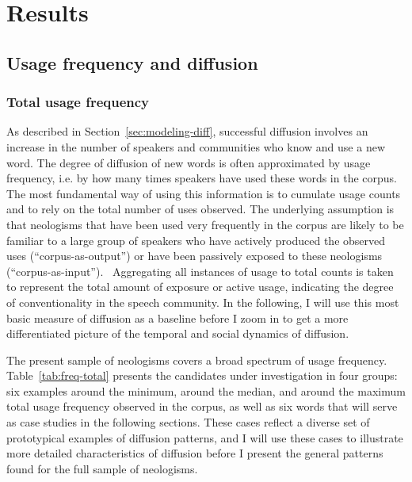 \documentclass[
  a4paper,
  abstract=on,
  captions=tableabove
  ]{scrartcl}
\begin{document}
\section{Results}
  \label{sec:results}

  \subsection{Usage frequency and diffusion}
    \label{subsec:freq}

    \subsubsection{Total usage frequency}
      \label{subsec:total-freq}

      As described in Section~\ref{sec:modeling-diff}, successful diffusion involves an increase in the number of speakers and communities who know and use a new word. The degree of diffusion of new words is often approximated by usage frequency, i.e. by how many times speakers have used these words in the corpus. The most fundamental way of using this information is to cumulate usage counts and to rely on the total number of uses observed. The underlying assumption is that neologisms that have been used very frequently in the corpus are likely to be familiar to a large group of speakers who have actively produced the observed uses (\enquote{corpus-as-output}) or have been passively exposed to these neologisms (\enquote{corpus-as-input}).~\parencite{Stefanowitsch2017CorpusbasedPerspective} Aggregating all instances of usage to total counts is taken to represent the total amount of exposure or active usage, indicating the degree of conventionality in the speech community. In the following, I will use this most basic measure of diffusion as a baseline before I zoom in to get a more differentiated picture of the temporal and social dynamics of diffusion.

      The present sample of neologisms covers a broad spectrum of usage frequency. Table~\ref{tab:freq-total} presents the candidates under investigation in four groups: six examples around the minimum, around the median, and around the maximum total usage frequency observed in the corpus, as well as six words that will serve as case studies in the following sections. These cases reflect a diverse set of prototypical examples of diffusion patterns, and I will use these cases to illustrate more detailed characteristics of diffusion before I present the general patterns found for the full sample of neologisms.
\end{document}
